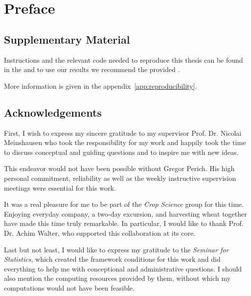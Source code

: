 \chapter*{Preface}

\section*{Supplementary Material}


Instructions and the relevant code needed to reproduce this thesis can be found in the \href{https://github.com/LGraz/MasterThesis-Code}{\color{blue}{GitHub repository}} and to use our results we recommend the provided \href{https://github.com/LGraz/CorrectTimeSeries }{\color{blue}{R-package}}.

More information is given in the appendix~\ref{app:reproducibility}.  


\section*{Acknowledgements}
First, I wish to express my sincere gratitude to my supervisor Prof. Dr. Nicolai Meinshausen who took the responsibility for my work and happily took the time to discuss conceptual and guiding questions and to inspire me with new ideas. 

This endeavor would not have been possible without Gregor Perich. His high personal commitment, reliability as well as the weekly instructive supervision meetings were essential for this work. 

It was a real pleasure for me to be part of the \textit{Crop Science} group for this time. Enjoying everyday company, a two-day excursion, and harvesting wheat together have made this time truly remarkable. In particular, I would like to thank Prof. Dr. Achim Walter, who supported this collaboration at its core.  

Last but not least, I would like to express my gratitude to the \textit{Seminar for Statistics}, which created the framework conditions for this work and did everything to help me with conceptional and administrative questions. I should also mention the computing resources provided by them, without which my computations would not have been feasible.

